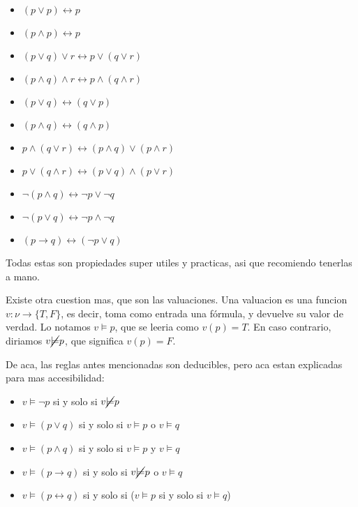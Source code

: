 \documentclass{article}
\begin{document}
\begin{multicols}{2}
	\begin{itemize}
		
		\item $(p \lor p) \longleftrightarrow p$
		\item $(p \land p) \longleftrightarrow p$

		\item $(p \lor q) \lor r \longleftrightarrow p \lor (q \lor r)$
		\item $(p \land q) \land r \longleftrightarrow p \land (q \land r)$

		\item $(p \lor q) \longleftrightarrow (q \lor p)$
		\item $(p \land q) \longleftrightarrow (q \land p)$
		
		\item $p \land (q \lor r) \longleftrightarrow (p \land q) \lor (p \land r)$
		\item $p \lor (q \land r) \longleftrightarrow (p \lor q) \land (p \lor r)$
		
		\item $\neg (p \land q) \longleftrightarrow \neg p \lor \neg q$
		\item $\neg (p \lor q) \longleftrightarrow \neg p \land \neg q$
		
		\item $(p \longrightarrow q) \longleftrightarrow (\neg p \lor q)$
		
	\end{itemize}
\end{multicols}

Todas estas son propiedades super utiles y practicas, asi que recomiendo tenerlas a mano.

Existe otra cuestion mas, que son las valuaciones. Una valuacion es una funcion $v : \nu \longrightarrow \{ T, F\}$, es decir, toma como entrada una fórmula, y devuelve su valor de verdad. Lo notamos $v \models p$, que se leeria como $v(p) = T$. En caso contrario, diriamos $v \cancel{\models} p$, que significa $v(p) = F$.

De aca, las reglas antes mencionadas son deducibles, pero aca estan explicadas para mas accesibilidad:


\begin{itemize}
	\item $v \models \neg p$ si y solo si $v \cancel{\models} p$
	
	\item $v \models (p \lor q)$ si y solo si $v \models p$ o $v \models q$
	\item $v \models (p \land q)$ si y solo si $v \models p$ y $v \models q$
	
	\item $v \models (p \longrightarrow q)$ si y solo si $v \cancel{\models} p$ o $v \models q$
	\item $v \models (p \longleftrightarrow q)$ si y solo si ($v \models p$ si y solo si $v \models q$)	
\end{itemize}
\end{document}
